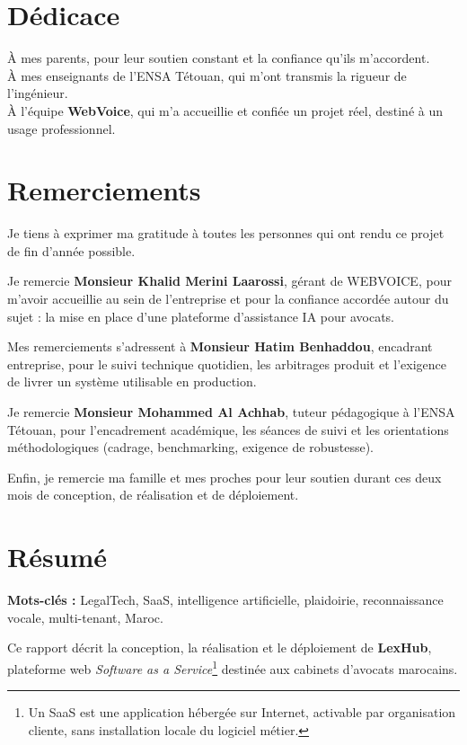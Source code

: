 \chapter*{Dédicace}

À mes parents, pour leur soutien constant et la confiance qu'ils m'accordent.\\[0.4em]
À mes enseignants de l'ENSA Tétouan, qui m'ont transmis la rigueur de l'ingénieur.\\[0.4em]
À l'équipe \textbf{WebVoice}, qui m'a accueillie et confiée un projet réel, destiné à un usage professionnel.

\chapter*{Remerciements}

Je tiens à exprimer ma gratitude à toutes les personnes qui ont rendu ce projet de fin d'année possible.

Je remercie \textbf{Monsieur Khalid Merini Laarossi}, gérant de WEBVOICE, pour m'avoir accueillie au sein de l'entreprise et pour la confiance accordée autour du sujet : la mise en place d'une plateforme d'assistance IA pour avocats.

Mes remerciements s'adressent à \textbf{Monsieur Hatim Benhaddou}, encadrant entreprise, pour le suivi technique quotidien, les arbitrages produit et l'exigence de livrer un système utilisable en production.

Je remercie \textbf{Monsieur Mohammed Al Achhab}, tuteur pédagogique à l'ENSA Tétouan, pour l'encadrement académique, les séances de suivi et les orientations méthodologiques (cadrage, benchmarking, exigence de robustesse).

Enfin, je remercie ma famille et mes proches pour leur soutien durant ces deux mois de conception, de réalisation et de déploiement.

\chapter*{Résumé}

\textbf{Mots-clés :} LegalTech, SaaS, intelligence artificielle, plaidoirie, reconnaissance vocale, multi-tenant, Maroc.

Ce rapport décrit la conception, la réalisation et le déploiement de \textbf{LexHub}, plateforme web \textit{Software as a Service}\footnote{Un SaaS est une application hébergée sur Internet, activable par organisation cliente, sans installation locale du logiciel métier.} destinée aux cabinets d'avocats marocains.

